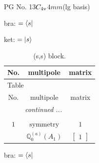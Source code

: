 \documentclass[fleqn,8pt,landscape]{jsarticle}
\begin{document}
\setcounter{MaxMatrixCols}{32}

\renewcommand{\tablename}{Table~}
\renewcommand{\figurename}{Figure~}
\begin{center}
\LARGE
PG No. 13\quad$C_{\rm 4v}$\quad$4mm$\quad[ tetragonal ] (lg basis)
\end{center}
bra: $=\bra{s}$

\noindent
ket: $=\ket{s}$
\renewcommand{\arraystretch}{1.6}
\begin{longtable}{ccc}
\caption{(s,s) block.}
 \\
 \hline \hline
No. & multipole & matrix \\ \hline \endfirsthead

\multicolumn{2}{l}{\tablename\ \thetable{}} \\
 \hline \hline
No. & multipole & matrix \\ \hline \endhead

 \hline \hline
\multicolumn{2}{r}{\footnotesize\it continued ...} \\ \endfoot

 \hline \hline
\multicolumn{2}{r}{} \\ \endlastfoot

$ 1 $ & $ \text{symmetry} $ & $ 1 $ \\
$  $ & $ \mathbb{Q}_{0}^{(a)}(A_{1}) $ & $ \begin{bmatrix} 1 \end{bmatrix} $ \\ \hline
\end{longtable}
bra: $=\bra{s}$
\end{document}
